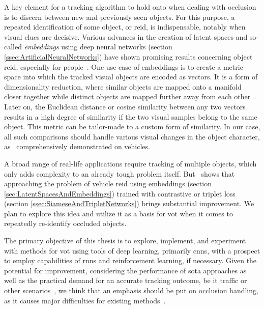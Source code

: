 A key element for a tracking algorithm to hold onto when dealing with occlusion is to discern between new and previously seen objects. For this purpose, a repeated identification of some object, or \gls{reid}, is indispensable, notably when visual clues are decisive. Various advances in the creation of latent spaces and so-called \emph{embeddings} using deep neural networks (section \ref{ssec:ArtificialNeuralNetworks}) have shown promising results concerning object \gls{reid}, especially for people~\cite{schroff2015facenet, taigman2014deepface}. One use case of embeddings is to create a metric space into which the tracked visual objects are encoded as vectors. It is a form of dimensionality reduction, where similar objects are mapped onto a manifold closer together while distinct objects are mapped further away from each other~\cite{hadsell2006dimreduction}. Later on, the Euclidean distance or cosine similarity between any two vectors results in a high degree of similarity if the two visual samples belong to the same object. This metric can be tailor-made to a custom form of similarity. In our case, all such comparisons should handle various visual changes in the object character, as~\cite{kuma2019vehiclereid} comprehensively demonstrated on vehicles.

A broad range of real-life applications require tracking of multiple objects, which only adds complexity to an already tough problem itself. But~\cite{kuma2019vehiclereid} shows that approaching the problem of vehicle \gls{reid} using embeddings (section \ref{sec:LatentSpacesAndEmbeddings}) trained with contrastive or triplet loss (section \ref{ssec:SiameseAndTripletNetworks}) brings substantial improvement. We plan to explore this idea and utilize it as a basis for \gls{vot} when it comes to repeatedly re-identify occluded objects.

The primary objective of this thesis is to explore, implement, and experiment with methods for \gls{vot} using tools of deep learning, primarily \glspl{cnn}, with a prospect to employ capabilities of \glspl{rnn} and reinforcement learning, if necessary. Given the potential for improvement, considering the performance of \gls{sota} approaches as well as the practical demand for an accurate tracking outcome, be it traffic or other scenarios~\cite{tang2019cityflow}, we think that an emphasis should be put on occlusion handling, as it causes major difficulties for existing methods~\cite{jiyan2007robustocclusion}.

